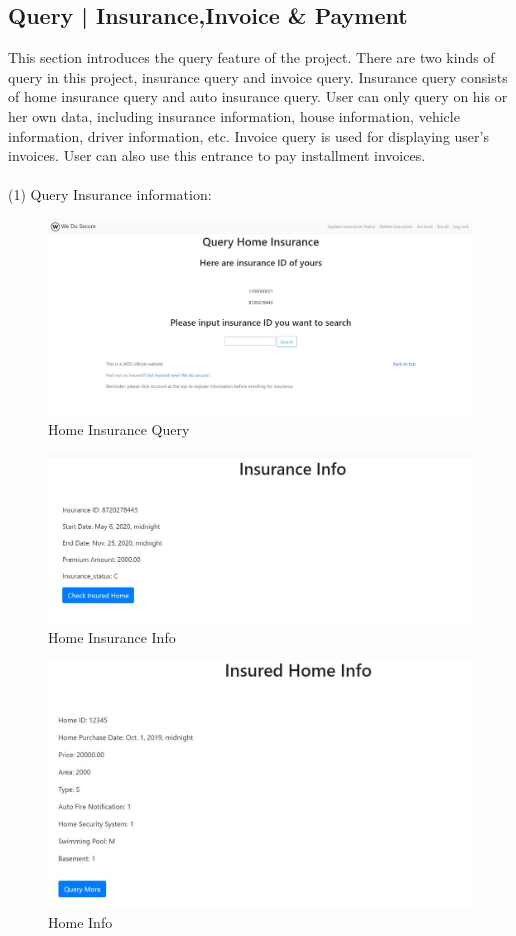 \documentclass[12pt]{article}
\begin{document}
	\subsection{Query | Insurance,Invoice \& Payment}
	\qquad This section introduces the query feature of the project. There are two kinds of query in this project, insurance query and invoice query. Insurance query consists of home insurance query and auto insurance query. User can only query on his or her own data, including insurance information, house information, vehicle information, driver information, etc. Invoice query is used for displaying user's invoices. User can also use this entrance to pay installment invoices.\\\\
	\noindent (1) Query Insurance information:
	\begin{figure}[H]
		\centering
		\includegraphics[scale=0.35]{homeinsurancequery}
		\caption{Home Insurance Query}
	\end{figure}
	\begin{figure}[H]
		\centering
		\includegraphics[scale=0.4]{insurinfo}
		\caption{Home Insurance Info}
	\end{figure}
	\begin{figure}[H]
		\centering
		\includegraphics[scale=0.4]{homeinfo}
		\caption{Home Info}
	\end{figure}
\end{document}
